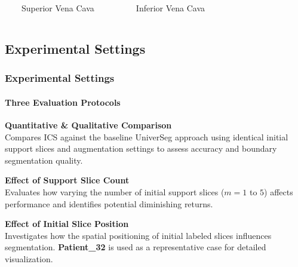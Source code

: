 \documentclass[nometaot,lecture,amberg,toc=twocolumn,indicatelastpageofframe,footlinebox]{OTHAWbeamer}
\begin{document}
\begin{frame}
{\begin{columns}[c]
            \vspace{0.4em}

            \begin{columns}[c]
                    {\small\textcolor{lila1}{\rule{0.7em}{0.7em}}~Superior Vena Cava}\\[0.4em]
                    {\small\textcolor[rgb]{0.9,0.8,0.05}{\rule{0.7em}{0.7em}}~Inferior Vena Cava}
            \end{columns}

    \end{columns}}

\end{frame}


\subsection{Experimental Settings}
\begin{frame}
    \frametitle{Experimental Settings}
    \framesubtitle{Three Evaluation Protocols}
    \vspace{0.6em}

    \textcolor{orange1}{\textbf{Quantitative \& Qualitative Comparison}}\\
    Compares ICS against the baseline UniverSeg approach using identical
    initial support slices and augmentation settings to assess accuracy
    and boundary segmentation quality.

    \vspace{0.5em}

    \textcolor{orange1}{\textbf{Effect of Support Slice Count}}\\
    Evaluates how varying the number of initial support slices ($m = 1$ to $5$)
    affects performance and identifies potential diminishing returns.

    \vspace{0.5em}

    \textcolor{orange1}{\textbf{Effect of Initial Slice Position}}\\
    Investigates how the spatial positioning of initial labeled slices influences
    segmentation. \textbf{Patient\_32} is used as a representative case for
    detailed visualization.

\end{frame}
\end{document}
